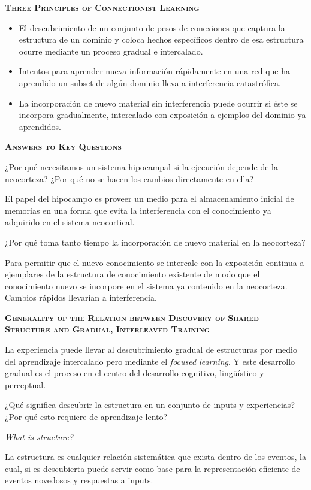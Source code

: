 \documentclass[a4paper,12pt]{article}
\begin{document}
{\scshape\bfseries Three Principles of Connectionist Learning}

\begin{itemize}
	\item El descubrimiento de un conjunto de pesos de conexiones que captura la estructura de un dominio y coloca hechos específicos dentro de esa estructura ocurre mediante un proceso gradual e intercalado.
	\item Intentos para aprender nueva información rápidamente en una red que ha aprendido un subset de algún dominio lleva a interferencia catastrófica.
	\item La incorporación de nuevo material sin interferencia puede ocurrir si éste se incorpora gradualmente, intercalado con exposición a ejemplos del dominio ya aprendidos.
\end{itemize}

{\scshape\bfseries Answers to Key Questions}

¿Por qué necesitamos un sistema hipocampal si la ejecución depende de la neocorteza? ¿Por qué no se hacen los cambios directamente en ella?

El papel del hipocampo es proveer un medio para el almacenamiento inicial de memorias en una forma que evita la interferencia con el conocimiento ya adquirido en el sistema neocortical.

¿Por qué toma tanto tiempo la incorporación de nuevo material en la neocorteza?

Para permitir que el nuevo conocimiento se intercale con la exposición continua a ejemplares de la estructura de conocimiento existente de modo que el conocimiento nuevo se incorpore en el sistema ya contenido en la neocorteza. Cambios rápidos llevarían a interferencia.

{\scshape\bfseries Generality of the Relation between Discovery of Shared Structure and Gradual, Interleaved Training}

La experiencia puede llevar al descubrimiento gradual de estructuras por medio del aprendizaje intercalado pero mediante el {\itshape focused learning}. Y este desarrollo gradual es el proceso en el centro del desarrollo cognitivo, lingüístico y perceptual. 

¿Qué significa descubrir la estructura en un conjunto de inputs y experiencias? ¿Por qué esto requiere de aprendizaje lento?

{\itshape What is structure?}

La estructura es cualquier relación sistemática que exista dentro de los eventos, la cual, si es descubierta puede servir como base para la representación eficiente de eventos novedosos y respuestas a inputs.
\end{document}
